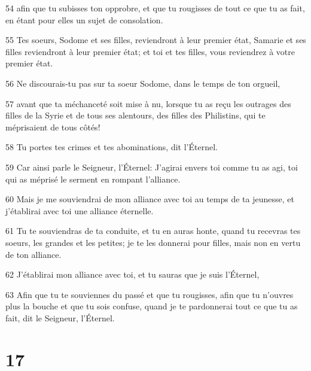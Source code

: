 \par 54 afin que tu subisses ton opprobre, et que tu rougisses de tout ce que tu as fait, en étant pour elles un sujet de consolation.
\par 55 Tes soeurs, Sodome et ses filles, reviendront à leur premier état, Samarie et ses filles reviendront à leur premier état; et toi et tes filles, vous reviendrez à votre premier état.
\par 56 Ne discourais-tu pas sur ta soeur Sodome, dans le temps de ton orgueil,
\par 57 avant que ta méchanceté soit mise à nu, lorsque tu as reçu les outrages des filles de la Syrie et de tous ses alentours, des filles des Philistins, qui te méprisaient de tous côtés!
\par 58 Tu portes tes crimes et tes abominations, dit l'Éternel.
\par 59 Car ainsi parle le Seigneur, l'Éternel: J'agirai envers toi comme tu as agi, toi qui as méprisé le serment en rompant l'alliance.
\par 60 Mais je me souviendrai de mon alliance avec toi au temps de ta jeunesse, et j'établirai avec toi une alliance éternelle.
\par 61 Tu te souviendras de ta conduite, et tu en auras honte, quand tu recevras tes soeurs, les grandes et les petites; je te les donnerai pour filles, mais non en vertu de ton alliance.
\par 62 J'établirai mon alliance avec toi, et tu sauras que je suis l'Éternel,
\par 63 Afin que tu te souviennes du passé et que tu rougisses, afin que tu n'ouvres plus la bouche et que tu sois confuse, quand je te pardonnerai tout ce que tu as fait, dit le Seigneur, l'Éternel.

\chapter{17}

